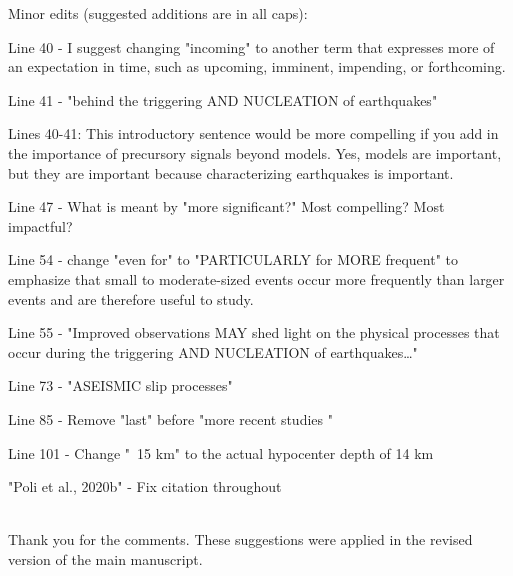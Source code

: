 \documentclass[10pt]{extarticle}
\begin{document}
\begin{ReviewerComment}{1}
\noindent Minor edits (suggested additions are in all caps): \\
\begin{item}
\vskip -0.5cm \item \noindent Line 40 - I suggest changing "incoming" to another term that expresses more of an expectation in time, such as upcoming, imminent, impending, or forthcoming. \\ 
\item \noindent Line 41 - "behind the triggering AND NUCLEATION of earthquakes" \\
\item \noindent Lines 40-41: This introductory sentence would be more compelling if you add in the importance of precursory signals beyond models. Yes, models are important, but they are important because characterizing earthquakes is important.\\
\item \noindent Line 47 - What is meant by "more significant?" Most compelling? Most impactful? \\
\item \noindent Line 54 -  change "even for" to "PARTICULARLY for MORE frequent" to emphasize that small to moderate-sized events occur more frequently than larger events and are therefore useful to study. \\
\item \noindent Line 55 - "Improved observations MAY shed light on the physical processes that occur during the triggering AND NUCLEATION of earthquakes…" \\
\item \noindent Line 73 - "ASEISMIC slip processes" \\
\item \noindent Line 85 - Remove "last" before "more recent studies " \\
\item \noindent Line 101 - Change "~15 km" to the actual hypocenter depth of 14 km \\
\item \noindent "Poli et al., 2020b" - Fix citation throughout
\end{item}
\end{ReviewerComment}

\begin{Answer}
 \WorkInProgressRevTask \\ \vskip 0.5cm
\noindent Thank you for the comments. These suggestions were applied in the revised version of the main manuscript. \\
\end{Answer}
%
%



\end{document}

